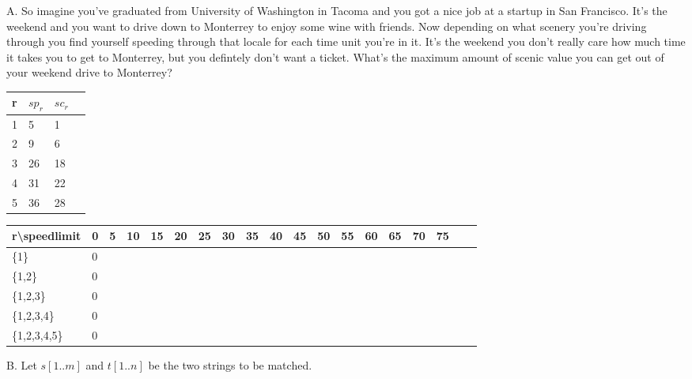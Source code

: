 \documentclass[12pt]{article}
\begin{document}
A. So imagine you've graduated from University of Washington
in Tacoma and you got a nice job at a startup in San Francisco. It's the weekend
and you want to drive down to Monterrey to enjoy some wine with friends.
Now depending on what scenery you're driving through you find yourself
speeding through that locale for each time unit you're in it. It's the weekend
you don't really care how much time it takes you to get to Monterrey, but you
defintely don't want a ticket. What's the maximum amount of scenic value you can get
out of your weekend drive to Monterrey?

\begin{table}[]
    \begin{tabular}{|l|l|l|l|}
    \hline
    r & $sp_r$ & $sc_r$ \\ \hline
    1 & 5    & 1    \\ \hline
    2 & 9    & 6    \\ \hline
    3 & 26    & 18    \\ \hline
    4 & 31    & 22    \\ \hline
    5 & 36    & 28    \\ \hline
    \end{tabular}
    \end{table}
    \FloatBarrier
    \begin{table}[]
        \begin{tabular}{|l|l|l|l|l|l|l|l|l|l|l|l|l|l|l|l|l|l|l|}
        \hline
        r\textbackslash{}speedlimit & 0 & 5 & 10 & 15 & 20 & 25 & 30  & 35 & 40 & 45 & 50 & 55 & 60 & 65 & 70 & 75 \\ \hline
        \{1\}                  & 0 &   &   &   &   &   &    &   &   &   &    &    &    &    &    &  \\ \hline
        \{1,2\}                  & 0 &   &   &   &   &   &    &   &   &   &    &    &    &    &    &     \\ \hline
        \{1,2,3\}                  & 0 &   &   &   &   &   &    &   &   &   &    &    &    &    &    &    \\ \hline
        \{1,2,3,4\}                  & 0 &   &   &   &   &   &    &   &   &   &    &    &    &    &    &      \\ \hline
        \{1,2,3,4,5\}                  & 0 &   &   &   &   &   &    &   &   &   &    &    &    &    &    &     \\ \hline
        \end{tabular}
        \end{table}
        \FloatBarrier
\newpage
\noindent B. Let $s[1..m]$ and $t[1..n]$ be the two strings to be matched. 
\end{document}

